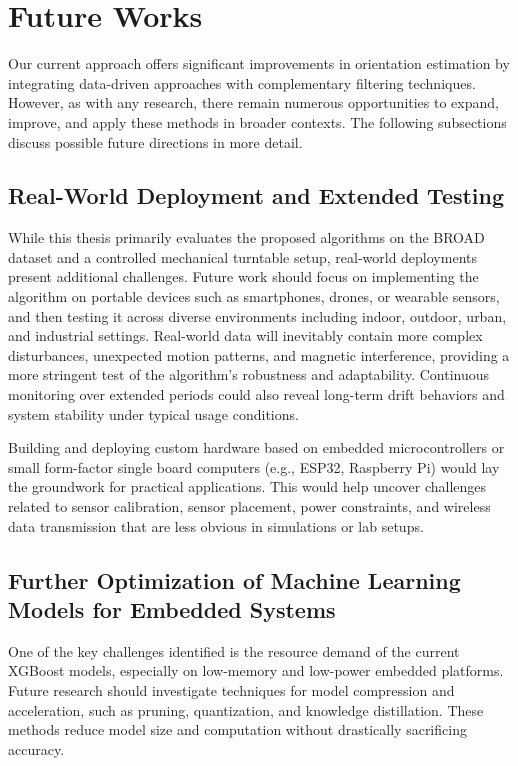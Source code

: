 \documentclass{iutbscthesis}
\begin{document}
\chapter{Future Works} \label{chapter:futureWorks}
Our current approach offers significant improvements in orientation estimation by integrating data-driven approaches with complementary filtering techniques. However, as with any research, there remain numerous opportunities to expand, improve, and apply these methods in broader contexts. The following subsections discuss possible future directions in more detail.

\section{Real-World Deployment and Extended Testing}
While this thesis primarily evaluates the proposed algorithms on the BROAD dataset and a controlled mechanical turntable setup, real-world deployments present additional challenges. Future work should focus on implementing the algorithm on portable devices such as smartphones, 
drones, or wearable sensors, and then testing it across diverse environments including indoor, outdoor, urban, and industrial settings. Real-world data will inevitably contain more complex disturbances, unexpected motion patterns, and magnetic interference, providing a more stringent test of the algorithm’s robustness and adaptability. Continuous monitoring over extended periods could also reveal long-term drift behaviors and system stability under typical usage conditions.

Building and deploying custom hardware based on embedded microcontrollers or small form-factor single board computers (e.g., ESP32, Raspberry Pi) would lay the groundwork for practical applications. This would help uncover challenges related to sensor calibration, sensor placement, power constraints, and wireless data transmission that are less obvious in simulations or lab setups.


\section{Further Optimization of Machine Learning Models for Embedded Systems}
One of the key challenges identified is the resource demand of the current XGBoost models, especially on low-memory and low-power embedded platforms. Future research should investigate techniques for model compression and acceleration, such as pruning, quantization, and knowledge distillation. These methods reduce model size and computation without drastically sacrificing accuracy.
\end{document}
